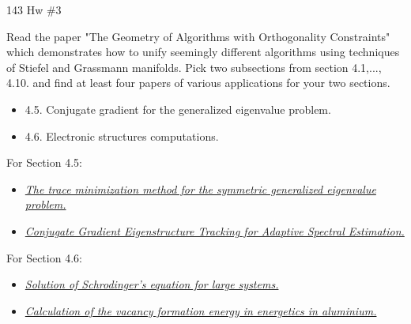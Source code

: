 \documentclass[12pt,letterpaper,boxed]{math_hw_pset}
\begin{document}
\begin{center}
    143 Hw \#3
\end{center}

\begin{exercise}[Problem 1]
    Read the paper "The Geometry of Algorithms with Orthogonality Constraints" 
    which demonstrates how to unify seemingly different algorithms using techniques 
    of Stiefel and Grassmann manifolds. Pick two subsections from section 4.1,..., 4.10.
    and find at least four papers of various applications for your two sections.
    \begin{itemize}
        \item 4.5. Conjugate gradient for the generalized eigenvalue problem.
        \item 4.6. Electronic structures computations. 
    \end{itemize}
\end{exercise}

\begin{solution}
    For Section 4.5: 
    \begin{itemize}
        \item \href{https://reader.elsevier.com/reader/sd/pii/S0377042700003915?token=6B6F954ECE0CDB0D47EF8E1E60D69E1FD58FD8F4804CA3F4CC42BB36CAAD77695353D91B41F0CD3384CD78CF3484EA7A}{\emph{The trace minimization method for the symmetric generalized eigenvalue problem.}}
        \item \href{https://ieeexplore.ieee.org/stamp/stamp.jsp?tp=&arnumber=382400&tag=1}{\emph{Conjugate Gradient Eigenstructure Tracking for Adaptive Spectral Estimation.}}
    \end{itemize}
    For Section 4.6:
    \begin{itemize}
        \item \href{https://journals.aps.org/prb/pdf/10.1103/PhysRevB.40.12255}{\emph{Solution of Schrodinger's equation for large systems.}}
        \item \href{https://iopscience.iop.org/article/10.1088/0953-8984/1/4/005/pdf}{\emph{Calculation of the vacancy formation energy in energetics in aluminium.}}
    \end{itemize}
\end{solution}
\end{document}
